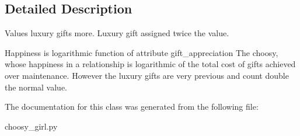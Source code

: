 \subsection{Detailed Description}
\begin{DoxyVerb}Values luxury gifts more.
Luxury gift assigned twice the value.

Happiness is logarithmic function of attribute gift_appreciation
The choosy, whose happiness in a relationship is logarithmic of the total cost of gifts achieved over maintenance. However the luxury gifts are very previous and count double the normal value.\end{DoxyVerb}
 

The documentation for this class was generated from the following file\+:\begin{DoxyCompactItemize}
\item 
choosy\+\_\+girl.\+py\end{DoxyCompactItemize}

